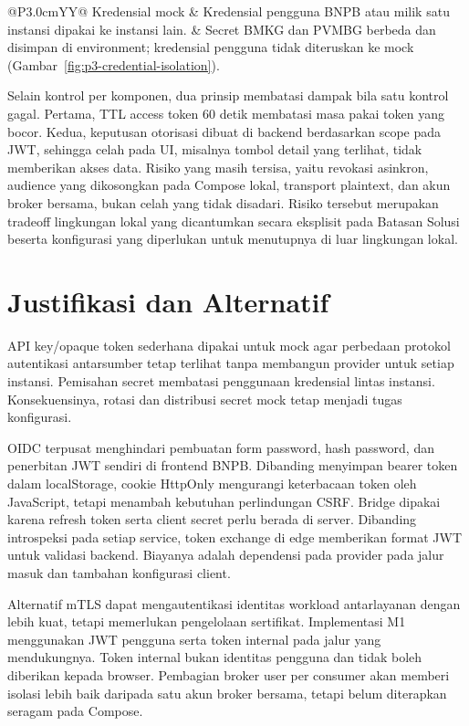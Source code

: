 \begin{table}[H]
\begin{tabularx}{\textwidth}{@{}P{3.0cm}YY@{}}
Kredensial mock & Kredensial pengguna BNPB atau milik satu instansi dipakai ke instansi lain. & Secret BMKG dan PVMBG berbeda dan disimpan di environment; kredensial pengguna tidak diteruskan ke mock (Gambar~\ref{fig:p3-credential-isolation}).\\\bottomrule
\end{tabularx}
\caption{Analisis celah yang mungkin muncul dari komponen Auth baru dan kontrol yang menutupnya.}
\label{tab:p3-threats}
\end{table}

Selain kontrol per komponen, dua prinsip membatasi dampak bila satu kontrol gagal. Pertama, TTL access token 60 detik membatasi masa pakai token yang bocor. Kedua, keputusan otorisasi dibuat di backend berdasarkan scope pada JWT, sehingga celah pada UI, misalnya tombol detail yang terlihat, tidak memberikan akses data. Risiko yang masih tersisa, yaitu revokasi asinkron, audience yang dikosongkan pada Compose lokal, transport plaintext, dan akun broker bersama, bukan celah yang tidak disadari. Risiko tersebut merupakan tradeoff lingkungan lokal yang dicantumkan secara eksplisit pada Batasan Solusi beserta konfigurasi yang diperlukan untuk menutupnya di luar lingkungan lokal.

\section{Justifikasi dan Alternatif}
API key/opaque token sederhana dipakai untuk mock agar perbedaan protokol autentikasi antarsumber tetap terlihat tanpa membangun provider untuk setiap instansi. Pemisahan secret membatasi penggunaan kredensial lintas instansi. Konsekuensinya, rotasi dan distribusi secret mock tetap menjadi tugas konfigurasi.

OIDC terpusat menghindari pembuatan form password, hash password, dan penerbitan JWT sendiri di frontend BNPB. Dibanding menyimpan bearer token dalam localStorage, cookie HttpOnly mengurangi keterbacaan token oleh JavaScript, tetapi menambah kebutuhan perlindungan CSRF. Bridge dipakai karena refresh token serta client secret perlu berada di server. Dibanding introspeksi pada setiap service, token exchange di edge memberikan format JWT untuk validasi backend. Biayanya adalah dependensi pada provider pada jalur masuk dan tambahan konfigurasi client.

Alternatif mTLS dapat mengautentikasi identitas workload antarlayanan dengan lebih kuat, tetapi memerlukan pengelolaan sertifikat. Implementasi M1 menggunakan JWT pengguna serta token internal  pada jalur yang mendukungnya. Token internal bukan identitas pengguna dan tidak boleh diberikan kepada browser. Pembagian broker user per consumer akan memberi isolasi lebih baik daripada satu akun broker bersama, tetapi belum diterapkan seragam pada Compose.

